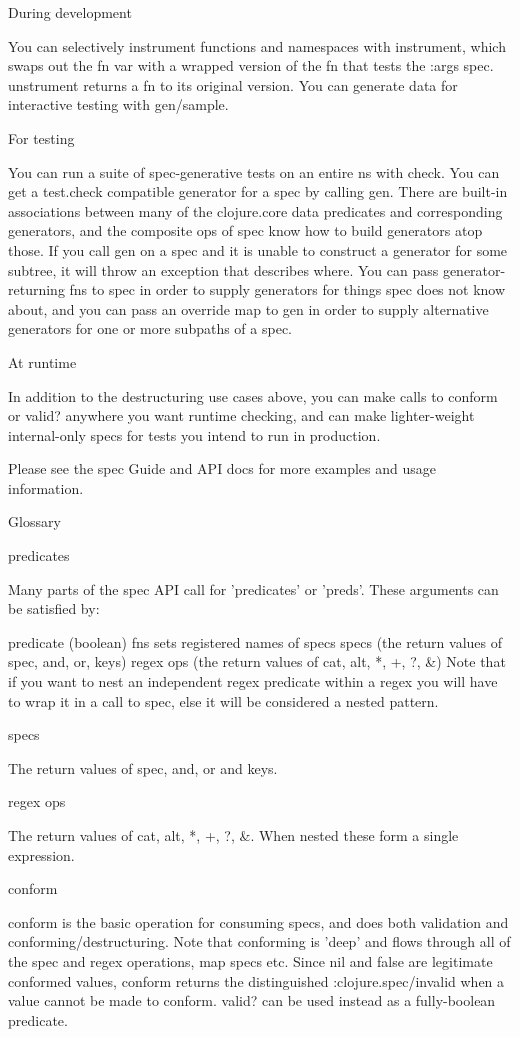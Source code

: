 During development

You can selectively instrument functions and namespaces with instrument, which swaps out the fn var with a wrapped version of the fn that tests the :args spec. unstrument returns a fn to its original version. You can generate data for interactive testing with gen/sample.

For testing

You can run a suite of spec-generative tests on an entire ns with check. You can get a test.check compatible generator for a spec by calling gen. There are built-in associations between many of the clojure.core data predicates and corresponding generators, and the composite ops of spec know how to build generators atop those. If you call gen on a spec and it is unable to construct a generator for some subtree, it will throw an exception that describes where. You can pass generator-returning fns to spec in order to supply generators for things spec does not know about, and you can pass an override map to gen in order to supply alternative generators for one or more subpaths of a spec.

At runtime

In addition to the destructuring use cases above, you can make calls to conform or valid? anywhere you want runtime checking, and can make lighter-weight internal-only specs for tests you intend to run in production.

Please see the spec Guide and API docs for more examples and usage information.

Glossary

predicates

Many parts of the spec API call for 'predicates' or 'preds'. These arguments can be satisfied by:

predicate (boolean) fns
sets
registered names of specs
specs (the return values of spec, and, or, keys)
regex ops (the return values of cat, alt, *, +, ?, \&)
Note that if you want to nest an independent regex predicate within a regex you will have to wrap it in a call to spec, else it will be considered a nested pattern.

specs

The return values of spec, and, or and keys.

regex ops

The return values of cat, alt, *, +, ?, \&. When nested these form a single expression.

conform

conform is the basic operation for consuming specs, and does both validation and conforming/destructuring. Note that conforming is 'deep' and flows through all of the spec and regex operations, map specs etc. Since nil and false are legitimate conformed values, conform returns the distinguished :clojure.spec/invalid when a value cannot be made to conform. valid? can be used instead as a fully-boolean predicate.

